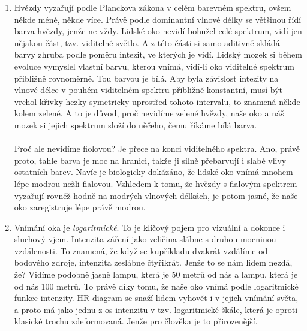 \documentclass{../../../../style/mkimain}
\begin{document}
\noindent{}
\klein
\begin{enumerate}
\item
Hvězdy vyzařují podle Planckova zákona v celém barevném spektru, ovšem někde méně, někde více.
Právě podle dominantní vlnové délky se většinou řídí barva hvězdy, jenže ne vždy.
Lidské oko nevidí bohužel celé spektrum, vidí jen nějakou část, tzv. viditelné světlo.
A z této části si samo aditivně skládá barvy zhruba podle poměru intezit, ve kterých je vidí.
Lidský mozek si během evoluce vymyslel vlastní barvu, kterou vnímá, vidí-li oko viditelné spektrum přibližně rovnoměrně.
Tou barvou je bílá. Aby byla závislost intezity na vlnové délce v pouhém viditelném spektru přibližně konstantní,
musí být vrchol křivky hezky symetricky uprostřed tohoto intervalu, to znamená někde kolem zelené. A to je důvod, proč nevidíme zelené hvězdy,
naše oko a náš mozek si jejich spektrum složí do něčeho, čemu říkáme bílá barva.
\\
\\
Proč ale nevidíme fiolovou? Je přece na konci viditelného spektra. Ano, právě proto, tahle barva je moc na hranici,
takže ji silně přebarvují i slabé vlivy ostatních barev. Navíc je biologicky dokázáno, že lidské oko vnímá mnohem lépe modrou nežli fialovou.
Vzhledem k tomu, že hvězdy s fialovým spektrem vyzařují rovněž hodně na modrých vlnových délkách, je potom jasné, že naše oko zaregistruje lépe právě modrou.
\item Vnímání oka je \emph{logaritmické}. To je klíčový pojem pro vizuální a dokonce i sluchový vjem. Intenzita záření jako veličina slábne s druhou mocninou vzdálenosti.
To znamená, že když se kupříkladu dvakrát vzdálíme od bodového zdroje, intenzita zeslábne čtyřikrát. Jenže to se nám lidem nezdá, že?
Vidíme podobně jasně lampu, která je 50 metrů od nás a lampu, která je od nás 100 metrů. To právě díky tomu, že naše oko vnímá podle logaritmické funkce intenzity.
HR diagram se snaží lidem vyhovět i v jejich vnímání světa, a proto má jako jednu z os intenzitu v tzv. logaritmické škále, která je oproti klasické trochu zdeformovaná. Jenže pro člověka je to přirozenější.
\end{enumerate}
\end{document}
